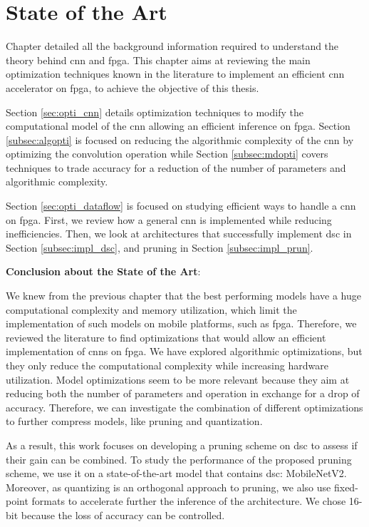 \chapter{State of the Art} \label{chap:sota}
Chapter  detailed all the background information required to understand the theory behind \acrshort{cnn} and \acrshort{fpga}. This chapter aims at reviewing the main optimization techniques known in the literature to implement an efficient \acrshort{cnn} accelerator on \acrshort{fpga}, to achieve the objective of this thesis.

Section \ref{sec:opti_cnn} details optimization techniques to modify the computational model of the \acrshort{cnn} allowing an efficient inference on \acrshort{fpga}. Section \ref{subsec:algopti} is focused on reducing the algorithmic complexity of the \acrshort{cnn} by optimizing the convolution operation while Section \ref{subsec:mdopti} covers techniques to trade accuracy for a reduction of the number of parameters and algorithmic complexity.

Section \ref{sec:opti_dataflow} is focused on studying efficient ways to handle a \acrshort{cnn} on \acrshort{fpga}. First, we review how a general \acrshort{cnn} is implemented while reducing inefficiencies. Then, we look at architectures that successfully implement \acrshort{dsc} in Section \ref{subsec:impl_dsc}, and pruning in Section \ref{subsec:impl_prun}.

%

%
\begin{tcolorbox}
    \textbf{Conclusion about the State of the Art}: \newline \newline

    We knew from the previous chapter that the best performing models have a huge computational complexity and memory utilization, which limit the implementation of such models on mobile platforms, such as \acrshort{fpga}. Therefore, we reviewed the literature to find optimizations that would allow an efficient implementation of \acrshort{cnn}s on \acrshort{fpga}. We have explored algorithmic optimizations, but they only reduce the computational complexity while increasing hardware utilization. Model optimizations seem to be more relevant because they aim at reducing both the number of parameters and operation in exchange for a drop of accuracy. Therefore, we can investigate the combination of different optimizations to further compress models, like pruning and quantization. \newline \newline
    
    As a result, this work focuses on developing a pruning scheme on \acrshort{dsc} to assess if their gain can be combined. To study the performance of the proposed pruning scheme, we use it on a state-of-the-art model that contains \acrshort{dsc}: MobileNetV2. Moreover, as quantizing is an orthogonal approach to pruning, we also use fixed-point formats to accelerate further the inference of the architecture. We chose 16-bit because the loss of accuracy can be controlled.
\end{tcolorbox}
\newpage
